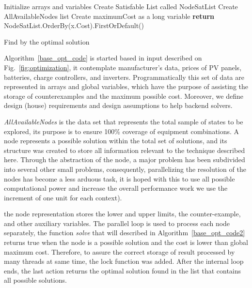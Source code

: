 \documentclass[10pt,journal,compsoc]{IEEEtran}
\begin{document}
\begin{algorithm}[ht]
\SetAlgoLined
{}
 Initialize arrays and variables\;
Create Satisfable List called NodeSatList\;
Create AllAvailableNodes list\;
Create maximumCost as a long variable\;
\textbf{return} NodeSatList.OrderBy(x.Cost).FirstOrDefault()
\caption{Find by the optimal solution}
\label{base_opt_code}
\end{algorithm}

Algorithm~\ref{base_opt_code} is started based in input described on Fig.~\ref{fig:optimization}, it contemplate manufacturer’s data, prices of PV panels, batteries, charge controllers, and inverters. Programmatically this set of data are represented in arrays and global variables, which have the purpose of assisting the storage of counterexamples and the maximum possible cost. Moreover, we define design (house) requirements and design assumptions to help backend solvers. 

\textit{AllAvailableNodes} is the data set that represents the total sample of states to be explored, its purpose is to ensure 100\% coverage of equipment combinations. A node represents a possible solution within the total set of solutions, and its structure was created to store all information relevant to the technique described here. Through the abstraction of the node, a major problem has been subdivided into several other small problems, consequently, parallelizing the resolution of the nodes has become a less arduous task, it is hoped with this to use all possible computational power and increase the overall performance work we use the increment of one unit for each context).

the node representation stores the lower and upper limits, the counter-example, and other auxiliary variables. The parallel loop is used to process each node separately, the function \textit{solve} that will described in Algorithm~\ref{base_opt_code2} returns true when the node is a possible solution and the cost is lower than global maximum cost. Therefore, to assure the correct storage of result processed by many threads at same time, the lock function was added. After the internal loop ends, the last action returns the optimal solution found in the list that contains all possible solutions.
\end{document}
